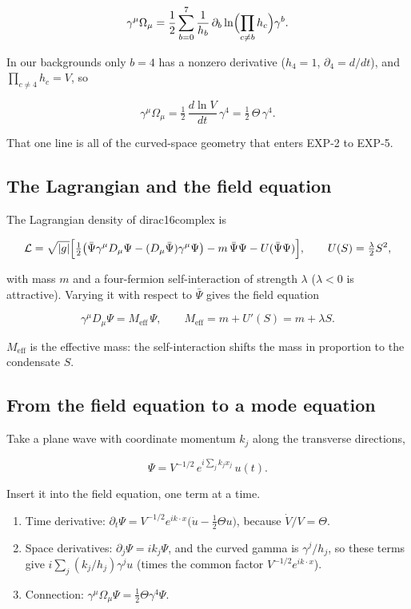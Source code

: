 \documentclass[11pt]{article}
\begin{document}
\[
\gamma^\mu\Omega_\mu=\frac12\sum_{b=0}^{7}\frac{1}{h_b}\,\partial_b\ln\Bigl(\prod_{c\ne b}h_c\Bigr)\gamma^b .
\]

In our backgrounds only $b=4$ has a nonzero derivative ($h_4=1$, $\partial_4=d/dt$), and $\prod_{c\ne4}h_c=V$, so

\[
\gamma^\mu\Omega_\mu=\tfrac12\,\frac{d\ln V}{dt}\,\gamma^4=\tfrac12\,\Theta\,\gamma^4 .
\]

That one line is all of the curved-space geometry that enters EXP-2 to EXP-5.

\subsection{The Lagrangian and the field equation}

The Lagrangian density of dirac16complex is

\[
\mathcal L=\sqrt{|g|}\Bigl[\tfrac12\bigl(\bar\Psi\gamma^\mu D_\mu\Psi-(D_\mu\bar\Psi)\gamma^\mu\Psi\bigr)-m\,\bar\Psi\Psi-U(\bar\Psi\Psi)\Bigr],\qquad U(S)=\tfrac{\lambda}{2}S^2 ,
\]

with mass $m$ and a four-fermion self-interaction of strength $\lambda$ ($\lambda<0$ is attractive). Varying it with respect to $\bar\Psi$ gives the field equation

\[
\gamma^\mu D_\mu\Psi=M_{\mathrm{eff}}\,\Psi,\qquad M_{\mathrm{eff}}=m+U'(S)=m+\lambda S .
\]

$M_{\mathrm{eff}}$ is the effective mass: the self-interaction shifts the mass in proportion to the condensate $S$.

\subsection{From the field equation to a mode equation}

Take a plane wave with coordinate momentum $k_j$ along the transverse directions,

\[
\Psi=V^{-1/2}\,e^{i\sum_jk_jx_j}\,u(t).
\]

Insert it into the field equation, one term at a time.

\begin{enumerate}
\item Time derivative: $\partial_t\Psi=V^{-1/2}e^{ik\cdot x}\bigl(\dot u-\tfrac12\Theta u\bigr)$, because $\dot V/V=\Theta$.
\item Space derivatives: $\partial_j\Psi=ik_j\Psi$, and the curved gamma is $\gamma^j/h_j$, so these terms give $i\sum_j(k_j/h_j)\gamma^j u$ (times the common factor $V^{-1/2}e^{ik\cdot x}$).
\item Connection: $\gamma^\mu\Omega_\mu\Psi=\tfrac12\Theta\gamma^4\Psi$.
\end{enumerate}
\end{document}

